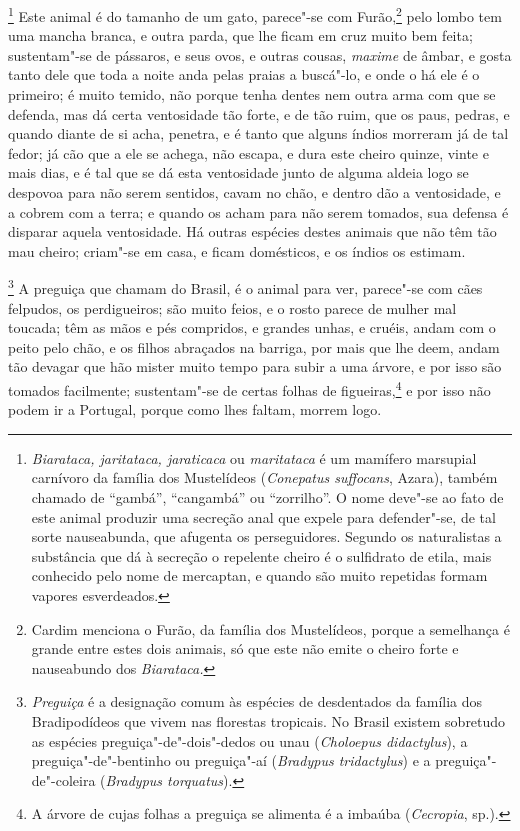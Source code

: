 \footnote{ \textit{Biarataca, jaritataca,
jaraticaca} ou \textit{maritataca} é um mamífero marsupial carnívoro
da família dos Mustelídeos (\textit{Conepatus suffocans}, Azara),
também chamado de ``gambá'', ``cangambá'' ou ``zorrilho''. O nome deve"-se ao
fato de este animal produzir uma secreção anal que expele para
defender"-se, de tal sorte nauseabunda, que afugenta os perseguidores.
Segundo os naturalistas a substância que dá à secreção o repelente
cheiro é o sulfidrato de etila, mais conhecido pelo nome de mercaptan,
e quando são muito repetidas formam vapores esverdeados.} Este animal é 
do tamanho de um gato, parece"-se com Furão,\footnote{ Cardim menciona o 
Furão, da família dos Mustelídeos, porque a
semelhança é grande entre estes dois animais, só que este não emite o
cheiro forte e nauseabundo dos \textit{Biarataca.}} pelo lombo tem uma
mancha branca, e outra parda, que lhe ficam em cruz muito bem feita;
sustentam"-se de pássaros, e seus ovos, e outras cousas, \textit{maxime}
de âmbar, e gosta tanto dele que toda a noite anda pelas praias a
buscá"-lo, e onde o há ele é o primeiro; é muito temido, não
porque tenha dentes nem outra arma com que se defenda, mas dá certa
ventosidade tão forte, e de tão ruim, que os paus, pedras, e quando
diante de si acha, penetra, e é tanto que alguns índios morreram já de
tal fedor; já cão que a ele se achega, não escapa, e dura este cheiro
quinze, vinte e mais dias, e é tal que se dá esta ventosidade junto de
alguma aldeia logo se despovoa para não serem sentidos, cavam no chão,
e dentro dão a ventosidade, e a cobrem com a terra; e quando os acham
para não serem tomados, sua defensa é disparar aquela ventosidade.
 Há outras espécies destes animais que não têm tão mau cheiro; criam"-se
em casa, e ficam domésticos, e os índios os estimam.

\footnote{ \textit{Preguiça} é a designação
comum às espécies de desdentados da família dos Bradipodídeos que vivem
nas florestas tropicais. No Brasil existem sobretudo as espécies
preguiça"-de"-dois"-dedos ou unau (\textit{Choloepus didactylus}), a
preguiça"-de"-bentinho ou preguiça"-aí (\textit{Bradypus tridactylus}) e a
preguiça"-de"-coleira (\textit{Bradypus torquatus}).} A
preguiça que chamam do Brasil, é o animal para ver, parece"-se com cães
felpudos, os perdigueiros; são muito feios, e o rosto parece de mulher
mal toucada; têm as mãos e pés compridos, e grandes unhas, e cruéis,
andam com o peito pelo chão, e os filhos abraçados na barriga, por mais
que lhe deem, andam tão devagar que hão mister muito tempo para subir a
uma árvore, e por isso são tomados facilmente; sustentam"-se de certas
folhas de figueiras,\footnote{ A árvore de cujas folhas a preguiça
se alimenta é a imbaúba (\textit{Cecropia}, sp.).} e por isso não
podem ir a Portugal, porque como lhes faltam, morrem logo.

